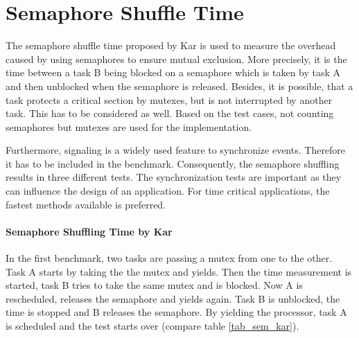 \section{Semaphore Shuffle Time}
The semaphore shuffle time proposed by Kar is used to measure the overhead caused by using semaphores to ensure mutual exclusion.
More precisely, it is the time between a task B being blocked on a semaphore which is taken by task A and then unblocked when the semaphore is released.  
Besides, it is possible, that a task protects a critical section by mutexes, but is not interrupted by another task.
This has to be considered as well.
Based on the test cases, not counting semaphores but mutexes are used for the implementation.
\par
Furthermore, signaling is a widely used feature to synchronize events.
Therefore it has to be included in the benchmark.  
Consequently, the semaphore shuffling results in three different tests.
The synchronization tests are important as they can influence the design of an application.
For time critical applications, the fastest methods available is preferred.

\paragraph{Semaphore Shuffling Time by Kar}
In the first benchmark, two tasks are passing a mutex from one to the other.
Task A starts by taking the the mutex and yields.
Then the time measurement is started, task B tries to take the same mutex and is blocked.
Now A is rescheduled, releases the semaphore and yields again.
Task B is unblocked, the time is stopped and B releases the semaphore.
By yielding the processor, task A is scheduled and the test starts over (compare table \ref{tab_sem_kar}).

